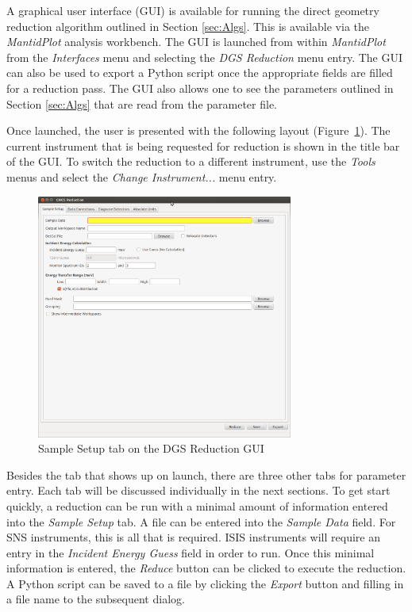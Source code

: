 A graphical user interface (GUI) is available for running the direct geometry reduction algorithm outlined in Section \ref{sec:Algs}. This is available via the \textit{MantidPlot} analysis workbench. The GUI is launched from within \textit{MantidPlot} from the \textit{Interfaces} menu and selecting the \textit{DGS Reduction} menu entry. The GUI can also be used to export a Python script once the appropriate fields are filled for a reduction pass. The GUI also allows one to see the parameters outlined in Section \ref{sec:Algs} that are read from the parameter file. 

Once launched, the user is presented with the following layout (Figure~\ref{fig:SamSet}). The current instrument that is being requested for reduction is shown in the title bar of the GUI. To switch the reduction to a different instrument, use the \textit{Tools} menus and select the \textit{Change Instrument...} menu entry. 
\begin{figure}[ht]
\centerline{\includegraphics[width=0.75\textwidth]{figures/SampleSetup.png}}
\caption{Sample Setup tab on the DGS Reduction GUI}
\label{fig:SamSet}
\end{figure}
Besides the tab that shows up on launch, there are three other tabs for parameter entry. Each tab will be discussed individually in the next sections. To get start quickly, a reduction can be run with a minimal amount of information entered into the \textit{Sample Setup} tab. A file can be entered into the \textit{Sample Data} field. For SNS instruments, this is all that is required. ISIS instruments will require an entry in the \textit{Incident Energy Guess} field in order to run. Once this minimal information is entered, the \textit{Reduce} button can be clicked to execute the reduction. A Python script can be saved to a file by clicking the \textit{Export} button and filling in a file name to the subsequent dialog.
